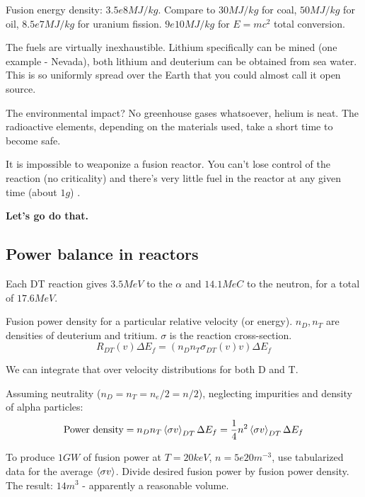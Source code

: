 \documentclass[PlasmaNotes.tex]{subfiles}
\begin{document}
Fusion energy density: $3.5e8 MJ/kg$. Compare to $30 MJ/kg$ for coal, $50 MJ/kg$ for oil, $8.5e7 MJ/kg$ for uranium fission. $9e10 MJ/kg$ for $E=mc^2$ total conversion.

The fuels are virtually inexhaustible. Lithium specifically can be mined (one example - Nevada), both lithium and deuterium can be obtained from sea water. This is so uniformly spread over the Earth that you could almost call it open source.

The environmental impact? No greenhouse gases whatsoever, helium is neat. The radioactive elements, depending on the materials used, take a short time to become safe.

It is impossible to weaponize a fusion reactor. You can't lose control of the reaction (no criticality) and there's very little fuel in the reactor at any given time (about $1g$) .


\begin{center}
\textbf{Let's go do that.}
\end{center}

\subsection{Power balance in reactors}

Each DT reaction gives $3.5 MeV$ to the $\alpha$ and $14.1 MeC$ to the neutron, for a total of $17.6 MeV$.

Fusion power density for a particular relative velocity (or energy). $n_D, n_T$ are densities of deuterium and tritium. $\sigma$ is the reaction cross-section.
\begin{equation}
R_{DT}(v) \Delta E_f = (n_D n_T \sigma_{DT} (v) v) \Delta E_f
\end{equation}

We can integrate that over velocity distributions for both D and T.

Assuming neutrality ($n_D=n_T=n_e/2=n/2$), neglecting impurities and density of alpha particles:
\begin{equation}
\text{Power density} = n_D n_T \left< \sigma v \right>_{DT} \Delta E_f = \frac{1}{4} n^2 \left< \sigma v \right>_{DT} \Delta E_f
\end{equation}

To produce $1GW$ of fusion power at $T=20keV$, $n=5e20 m^{-3}$, use tabularized data for the average $\left< \sigma v \right>$. Divide desired fusion power by fusion power density. The result: $14 m^3$ - apparently a reasonable volume.
\end{document}
